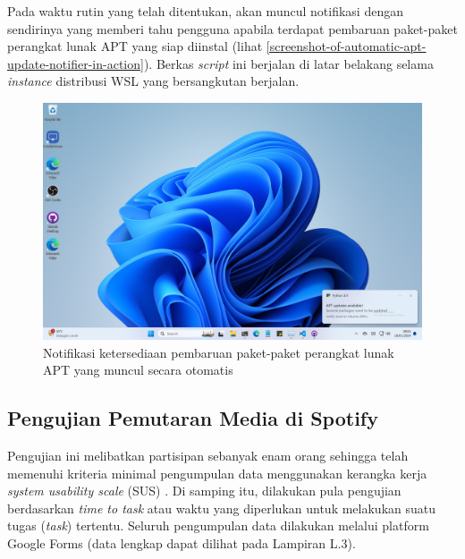 Pada waktu rutin yang telah ditentukan, akan muncul notifikasi dengan sendirinya yang memberi tahu pengguna apabila terdapat pembaruan paket-paket perangkat lunak APT yang siap diinstal (lihat \autoref{screenshot-of-automatic-apt-update-notifier-in-action}). Berkas \textit{script} ini berjalan di latar belakang selama \textit{instance} distribusi WSL yang bersangkutan berjalan.

\begin{figure}
    \centering
    \includegraphics[width=1\linewidth]{assets/Screenshot 2024-01-18 090529.png}
    \caption{Notifikasi ketersediaan pembaruan paket-paket perangkat lunak APT yang muncul secara otomatis}
    \label{screenshot-of-automatic-apt-update-notifier-in-action}
\end{figure}

\subsection{Pengujian Pemutaran Media di Spotify}

Pengujian ini melibatkan partisipan sebanyak enam orang sehingga telah memenuhi kriteria minimal pengumpulan data menggunakan kerangka kerja \textit{system usability scale} (SUS) \cite{measuringu-10-things-sus}. Di samping itu, dilakukan pula pengujian berdasarkan \textit{time to task} atau waktu yang diperlukan untuk melakukan suatu tugas (\textit{task}) tertentu. Seluruh pengumpulan data dilakukan melalui platform Google Forms (data lengkap dapat dilihat pada Lampiran L.3).

